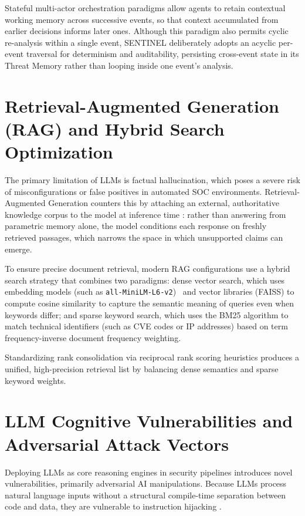 Stateful multi-actor orchestration paradigms \cite{langgraph2024} allow agents to retain contextual working memory across successive events, so that context accumulated from earlier decisions informs later ones. Although this paradigm also permits cyclic re-analysis within a single event, SENTINEL deliberately adopts an acyclic per-event traversal for determinism and auditability, persisting cross-event state in its Threat Memory rather than looping inside one event's analysis.

\section{Retrieval-Augmented Generation (RAG) and Hybrid Search Optimization}

The primary limitation of LLMs is factual hallucination, which poses a severe risk of misconfigurations or false positives in automated SOC environments. Retrieval-Augmented Generation counters this by attaching an external, authoritative knowledge corpus to the model at inference time \cite{rag2020}: rather than answering from parametric memory alone, the model conditions each response on freshly retrieved passages, which narrows the space in which unsupported claims can emerge.

To ensure precise document retrieval, modern RAG configurations use a hybrid search strategy that combines two paradigms: dense vector search, which uses embedding models (such as \texttt{all-MiniLM-L6-v2})~\cite{reimers2019sentence} and vector libraries (FAISS) to compute cosine similarity \cite{faiss2019} to capture the semantic meaning of queries even when keywords differ; and sparse keyword search, which uses the BM25 algorithm \cite{bm25_2009} to match technical identifiers (such as CVE codes or IP addresses) based on term frequency-inverse document frequency weighting.

Standardizing rank consolidation via reciprocal rank scoring heuristics \cite{rrf2009} produces a unified, high-precision retrieval list by balancing dense semantics and sparse keyword weights.

\section{LLM Cognitive Vulnerabilities and Adversarial Attack Vectors}

Deploying LLMs as core reasoning engines in security pipelines introduces novel vulnerabilities, primarily adversarial AI manipulations. Because LLMs process natural language inputs without a structural compile-time separation between code and data, they are vulnerable to instruction hijacking \cite{promptinjection2023}.

